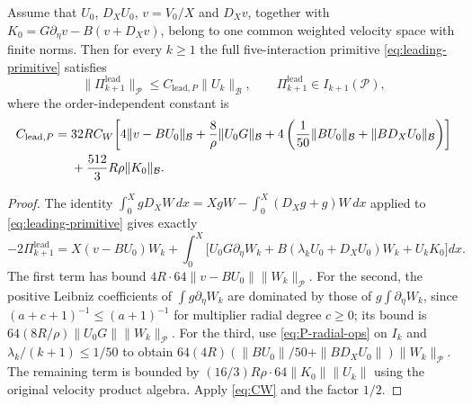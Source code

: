 \begin{theorem}
\label{thm:leading-bare-P}
Assume that $U_0$, $D_XU_0$, $v=V_0/X$ and $D_Xv$,
together with $K_0=G\partial_\eta v-B(v+D_Xv)$,
belong to one common weighted velocity space with finite norms.
Then for every $k\ge1$ the full five-interaction primitive
\eqref{eq:leading-primitive} satisfies
\[
 \|\Pi_{k+1}^{\mathrm{lead}}\|_{\mathcal P}
 \le C_{\mathrm{lead},P}\|U_k\|_{\mathcal B},
 \qquad \Pi_{k+1}^{\mathrm{lead}}\in I_{k+1}(\mathcal P),
\]
where the order-independent constant is
\begin{align}\label{eq:lead-P-constant}
 C_{\mathrm{lead},P}={}&32RC_W
 \biggl[4\|v-BU_0\|_{\mathcal B}
 +\frac8\rho\|U_0G\|_{\mathcal B}
 +4\left(\frac1{50}\|BU_0\|_{\mathcal B}
      +\|BD_XU_0\|_{\mathcal B}\right)\biggr]\notag\\
 &+\frac{512}{3}R\rho\|K_0\|_{\mathcal B}.
\end{align}
\end{theorem}
\begin{proof}
The identity
$\int_0^X gD_XW\,dx=XgW-\int_0^X(D_Xg+g)W\,dx$
applied to \eqref{eq:leading-primitive} gives exactly
\begin{equation}\label{eq:lead-P-IBP}
 -2\Pi_{k+1}^{\mathrm{lead}}
 =X(v-BU_0)W_k+
 \int_0^X\bigl[
 U_0G\partial_\eta W_k+
 B(\lambda_kU_0+D_XU_0)W_k+U_kK_0\bigr]dx.
\end{equation}
The first term has bound
$4R\cdot64\|v-BU_0\|\|W_k\|_{\mathcal P}$.
For the second, the positive Leibniz coefficients of
$\int g\partial_\eta W_k$ are dominated by those of
$g\int\partial_\eta W_k$, since
$(a+c+1)^{-1}\le(a+1)^{-1}$ for multiplier radial degree $c\ge0$;
its bound is $64(8R/\rho)\|U_0G\|\|W_k\|_{\mathcal P}$.
For the third, use \eqref{eq:P-radial-ops} on $I_k$ and
$\lambda_k/(k+1)\le1/50$ to obtain
$64(4R)(\|BU_0\|/50+\|BD_XU_0\|)\|W_k\|_{\mathcal P}$.
The remaining term is bounded by
$(16/3)R\rho\cdot64\|K_0\|\|U_k\|$ using the original
velocity product algebra. Apply \eqref{eq:CW} and the factor $1/2$.
\end{proof}


